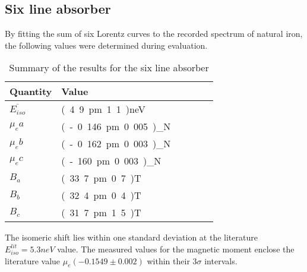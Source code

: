\subsection{Six line absorber}
By fitting the sum of six Lorentz curves to the recorded spectrum of natural iron, the following values were determined during evaluation.
\begin{table}[H]\centering
	\begin{tabular}{@{}llllll@{}}
		\toprule
		 Quantity& Value \\
		\midrule
		$\overline{E_{iso}}$ & \unit{(4.9\pm1.1)}{neV}\\
		$\mu_ea$ & \unit{(-0.146\pm0.005)}{\mu_N} \\
		$\mu_eb$ & \unit{(-0.162\pm0.003)}{\mu_N}\\
		$\mu_ec$ & \unit{(-160\pm0.003)}{\mu_N}\\
		$B_a$ & \unit{(33.7\pm0.7)}{T}  \\
		$B_b$ & \unit{(32.4\pm0.4)}{T}  \\
		$B_c$ & \unit{(31.7\pm1.5)}{T}  \\ 
		\bottomrule
	\end{tabular}
	\caption[Summary six line absorber]{Summary of the results for the six line absorber}
	\label{tb:summary:sixline abs}
\end{table}
The isomeric shift lies within one standard deviation at the literature $E^{lit}_{iso}=\unit{5.3}{neV}$ value. The measured values for the magnetic moment enclose the literature  value $\mu_e (-0.1549\pm0.002)$\cite{stone} within their 3$\sigma$ intervals.

